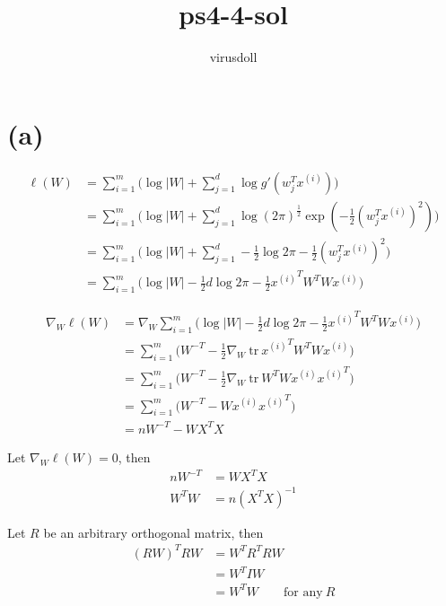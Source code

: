 \documentclass[11pt, a4paper]{article}
\title{ps4-4-sol}
\author{virusdoll}
\begin{document}
    \maketitle

    \section*{(a)}
    
    \begin{align*}
        \ell(W)
        & = \sum^m_{i=1} \big( \log |W| + \sum^d_{j=1} \log g' (w^T_j x^{(i)}) \big) \\
        & = \sum^m_{i=1} \big(
            \log |W|
            + \sum^d_{j=1} \log (2 \pi)^{\frac{1}{2}} \exp (- \frac{1}{2} (w^T_j x^{(i)})^2)
        \big) \\
        & = \sum^m_{i=1} \big(
            \log |W|
            + \sum^d_{j=1} - \frac{1}{2} \log 2 \pi - \frac{1}{2} (w^T_j x^{(i)})^2
        \big) \\
        & = \sum^m_{i=1} \big(
            \log |W|
            - \frac{1}{2} d \log 2 \pi
            - \frac{1}{2} {x^{(i)}}^T W^T W x^{(i)}
        \big)
    \end{align*}

    \begin{align*}
        \nabla_W \ell(W)
        & = \nabla_W \sum^m_{i=1} \big(
            \log |W|
            - \frac{1}{2} d \log 2 \pi
            - \frac{1}{2} {x^{(i)}}^T W^T W x^{(i)}
        \big) \\
        & = \sum^m_{i=1} \big(
            W^{-T}
            - \frac{1}{2} \nabla_W \ \text{tr} \ {x^{(i)}}^T W^T W x^{(i)}
        \big) \\
        & = \sum^m_{i=1} \big(
            W^{-T}
            - \frac{1}{2} \nabla_W \ \text{tr} \ W^T W x^{(i)} {x^{(i)}}^T
        \big) \\
        & = \sum^m_{i=1} \big( W^{-T} - W x^{(i)} {x^{(i)}}^T \big) \\
        & = n W^{-T} - W X^T X
    \end{align*}

    Let $\nabla_W \ell(W) = 0$, then
    \begin{align*}
        n W^{-T} & = W X^T X \\
        W^T W & = n (X^T X)^{-1}
    \end{align*}

    Let $R$ be an arbitrary orthogonal matrix, then
    \begin{align*}
        (RW)^T RW & = W^T R^T R W \\
        & = W^T I W \\
        & = W^T W \qquad \text{for any} \ R
    \end{align*}
\end{document}
